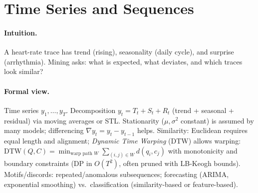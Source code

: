 \section{Time Series and Sequences}
\label{sec:timeseries}
\paragraph{Intuition.} A heart-rate trace has trend (rising), seasonality (daily cycle), and surprise (arrhythmia). Mining asks: what is expected, what deviates, and which traces look similar?

\paragraph{Formal view.} Time series $y_1,\dots,y_T$. Decomposition $y_t = T_t + S_t + R_t$ (trend + seasonal + residual) via moving averages or STL. Stationarity ($\mu,\sigma^2$ constant) is assumed by many models; differencing $\nabla y_t=y_t-y_{t-1}$ helps. Similarity: Euclidean requires equal length and alignment; \emph{Dynamic Time Warping} (DTW) allows warping: DTW$(Q,C)=\min_{\text{warp path }W}\sum_{(i,j)\in W}d(q_i,c_j)$ with monotonicity and boundary constraints (DP in $O(T^2)$, often pruned with LB-Keogh bounds). Motifs/discords: repeated/anomalous subsequences; forecasting (ARIMA, exponential smoothing) vs.\ classification (similarity-based or feature-based).

